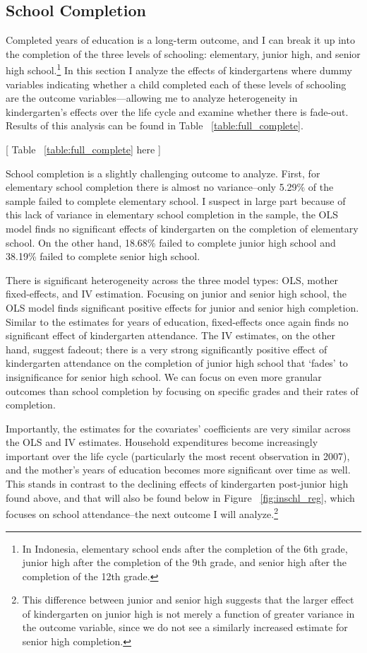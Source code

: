 \subsection{School Completion}

Completed years of education is a long-term outcome, and I can break it up into the completion of the three levels of schooling: elementary, junior high, and senior high school.\footnote{In Indonesia, elementary school ends after the completion of the 6th grade, junior high after the completion of the 9th grade, and senior high after the completion of the 12th grade.} In this section I analyze the effects of kindergartens where dummy variables indicating whether a child completed each of these levels of schooling are the outcome variables—allowing me to analyze heterogeneity in kindergarten’s effects over the life cycle and examine whether there is fade-out. Results of this analysis can be found in Table ~\ref{table:full_complete}.
\begin{center}
	[ Table ~\ref{table:full_complete} here ]
\end{center}
School completion is a slightly challenging outcome to analyze. First, for elementary school completion there is almost no variance--only 5.29\% of the sample failed to complete elementary school. I suspect in large part because of this lack of variance in elementary school completion in the sample, the OLS model finds no significant effects of kindergarten on the completion of elementary school. On the other hand, 18.68\% failed to complete junior high school and 38.19\% failed to complete senior high school.

There is significant heterogeneity across the three model types: OLS, mother fixed-effects, and IV estimation. Focusing on junior and senior high school, the OLS model finds significant positive effects for junior and senior high completion. Similar to the estimates for years of education, fixed-effects once again finds no significant effect of kindergarten attendance. The IV estimates, on the other hand, suggest fadeout; there is a very strong significantly positive effect of kindergarten attendance on the completion of junior high school that `fades' to insignificance for senior high school. We can focus on even more granular outcomes than school completion by focusing on specific grades and their rates of completion.

Importantly, the estimates for the covariates' coefficients are very similar across the OLS and IV estimates. Household expenditures become increasingly important over the life cycle (particularly the most recent observation in 2007), and the mother's years of education becomes more significant over time as well. This stands in contrast to the declining effects of kindergarten post-junior high found above, and that will also be found below in Figure ~\ref{fig:inschl_reg}, which focuses on school attendance--the next outcome I will analyze.\footnote{This difference between junior and senior high suggests that the larger effect of kindergarten on junior high is not merely a function of greater variance in the outcome variable, since we do not see a similarly increased estimate for senior high completion.}

